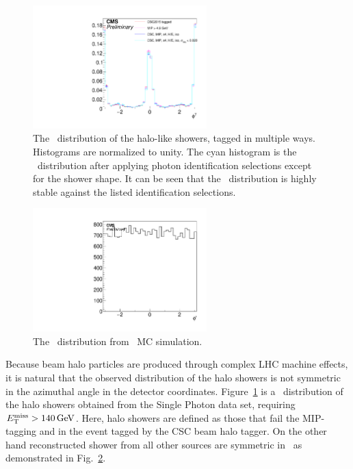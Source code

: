 \begin{figure}[tbp]
  \begin{center}
    \includegraphics[width=0.6\textwidth]{Reconstruction/Figures/halo/halophi.pdf}
    \caption{
      The \phig\ distribution of the halo-like showers, tagged in multiple ways. 
      Histograms are normalized to unity.
      The cyan histogram is the \phig\ distribution after applying photon identification selections except for the shower shape. 
      It can be seen that the \phig\ distribution is highly stable against the listed identification selections.
    }
    \label{fig:halophi}
  \end{center}
\end{figure}

\begin{figure}[tbp]
  \begin{center}
    \includegraphics[width=0.6\textwidth]{Reconstruction/Figures/halo/bkgphi.pdf}
    \caption{
      The \phig\ distribution from \zinvg\ MC simulation.
    }
    \label{fig:bkgphi}
  \end{center}
\end{figure}

Because beam halo particles are produced through complex LHC machine effects, it is natural that the observed distribution of the halo showers is not
symmetric in the azimuthal angle in the detector coordinates.
Figure~\ref{fig:halophi} is a \phig\ distribution of the halo showers obtained from the Single Photon data set, requiring $E_{\mathrm{T}}^{\text{miss}} > 140\,\text{Ge\hspace{-.08em}V}$. 
Here, halo showers are defined as those that fail the MIP-tagging and in the event tagged by the CSC beam halo tagger. 
On the other hand reconstructed shower from all other sources are symmetric in \phig\, as demonstrated in Fig.~\ref{fig:bkgphi}. 

